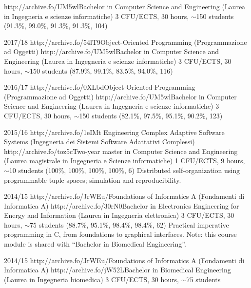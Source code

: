 \begin{outerlist}
        {http://archive.fo/UM5wl}{Bachelor in Computer Science and Engineering (Laurea in Ingegneria e scienze informatiche)}
        {3 CFU/ECTS, 30 hours, $\sim$150 students}
        {(91.3\%, 99.0\%, 91.3\%, 91.3\%, 104)}
        {\oopjava}
    \item[2017/18]
        \unibocourse
        {http://archive.fo/54lT9}{Object-Oriented Programming (Programmazione ad Oggetti)}
        {http://archive.fo/UM5wl}{Bachelor in Computer Science and Engineering (Laurea in Ingegneria e scienze informatiche)}
        {3 CFU/ECTS, 30 hours, $\sim$150 students}
        {(87.9\%, 99.1\%, 83.5\%, 94.0\%, 116)}
        {\oopjava}
    \item[2016/17]
        \unibocourse
        {http://archive.fo/0XLbd}{Object-Oriented Programming (Programmazione ad Oggetti)}
        {http://archive.fo/UM5wl}{Bachelor in Computer Science and Engineering (Laurea in Ingegneria e scienze informatiche)}
        {3 CFU/ECTS, 30 hours, $\sim$150 students}
        {(82.1\%, 97.5\%, 95.1\%, 90.2\%, 123)}
        {\oopjava}
    \item[2015/16]
        \unibocourse
        {http://archive.fo/1eIMt}{
            Engineering Complex Adaptive Software Systems
            (Ingegneria dei Sistemi Software Adattativi Complessi)
        }
        {http://archive.fo/toz5c}{Two-year master in Computer Science and Engineering (Laurea magistrale in Ingegneria e Scienze informatiche)}
        {1 CFU/ECTS, 9 hours, $\sim$10 students}
        {(100\%, 100\%, 100\%, 100\%, 6)}
        {Distributed self-organization using programmable tuple spaces; simulation and reproducibility.}
    \item[2014/15]
        \unibocourse
        {http://archive.fo/JrWEu/}{Foundations of Informatics A (Fondamenti di Informatica A)}
        {http://archive.fo/30rN0}{Bachelor in Electronics Engineering for Energy and Information (Laurea in Ingegneria elettronica)}
        {3 CFU/ECTS, 30 hours, $\sim$75 students}
        {(88.7\%, 95.1\%, 98.4\%, 98.4\%, 62)}
        {
            Practical imperative programming in C, from foundations to graphical interfaces.
            Note: this course module is shared with ``Bachelor in Biomedical Engineering''.
        }
    \item[2014/15]
        \unibocourse
        {http://archive.fo/JrWEu/}{Foundations of Informatics A (Fondamenti di Informatica A)}
        {http://archive.fo/jW52L}{Bachelor in Biomedical Engineering (Laurea in Ingegneria biomedica)}
        {3 CFU/ECTS, 30 hours, $\sim$75 students}

\end{outerlist}
